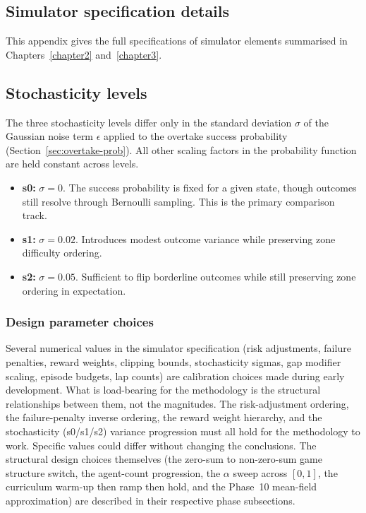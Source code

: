 \begin{appendices}
\chapter{Simulator specification details}
\label{appendix:simulator-details}

This appendix gives the full specifications of simulator elements summarised in Chapters~\ref{chapter2} and~\ref{chapter3}.

\section{Stochasticity levels}

The three stochasticity levels differ only in the standard deviation $\sigma$ of the Gaussian noise term $\epsilon$ applied to the overtake success probability (Section~\ref{sec:overtake-prob}). All other scaling factors in the probability function are held constant across levels.

\begin{itemize}
    \item \textbf{s0:} $\sigma = 0$. The success probability is fixed for a given state, though outcomes still resolve through Bernoulli sampling. This is the primary comparison track.
    \item \textbf{s1:} $\sigma = 0.02$. Introduces modest outcome variance while preserving zone difficulty ordering.
    \item \textbf{s2:} $\sigma = 0.05$. Sufficient to flip borderline outcomes while still preserving zone ordering in expectation.
\end{itemize}


\subsection{Design parameter choices}
\label{sec:design-parameters}

Several numerical values in the simulator specification (risk adjustments, failure penalties, reward weights, clipping bounds, stochasticity sigmas, gap modifier scaling, episode budgets, lap counts) are calibration choices made during early development. What is load-bearing for the methodology is the structural relationships between them, not the magnitudes. The risk-adjustment ordering, the failure-penalty inverse ordering, the reward weight hierarchy, and the stochasticity (s0/s1/s2) variance progression must all hold for the methodology to work. Specific values could differ without changing the conclusions. The structural design choices themselves (the zero-sum to non-zero-sum game structure switch, the agent-count progression, the $\alpha$ sweep across $[0,1]$, the curriculum warm-up then ramp then hold, and the Phase~10 mean-field approximation) are described in their respective phase subsections.


\end{appendices}
